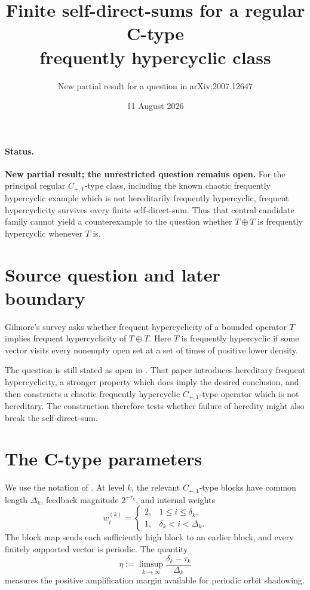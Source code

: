\documentclass[11pt]{article}
\title{Finite self-direct-sums for a regular C-type\\
frequently hypercyclic class}
\author{New partial result for a question in arXiv:2007.12647}
\date{11 August 2026}
\begin{document}
\maketitle

\paragraph{Status.}
\textbf{New partial result; the unrestricted question remains open.}
For the principal regular \(C_{+,1}\)-type class, including the known chaotic
frequently hypercyclic example which is not hereditarily frequently
hypercyclic, frequent hypercyclicity survives every finite self-direct-sum.
Thus that central candidate family cannot yield a counterexample to the
question whether \(T\oplus T\) is frequently hypercyclic whenever \(T\) is.

\section*{Source question and later boundary}
Gilmore's survey \cite{survey} asks whether frequent hypercyclicity of a
bounded operator \(T\) implies frequent hypercyclicity of \(T\oplus T\).
Here \(T\) is frequently hypercyclic if some vector visits every nonempty open
set at a set of times of positive lower density.

The question is still stated as open in \cite{hfhc}.  That paper introduces
hereditary frequent hypercyclicity, a stronger property which does imply the
desired conclusion, and then constructs a chaotic frequently hypercyclic
\(C_{+,1}\)-type operator which is not hereditary.  The construction therefore
tests whether failure of heredity might also break the self-direct-sum.

\section*{The C-type parameters}
We use the notation of \cite{gmm}.  At level \(k\), the relevant
\(C_{+,1}\)-type blocks have common length \(\Delta_k\), feedback magnitude
\(2^{-\tau_k}\), and internal weights
\[
 w_i^{(k)}=
 \begin{cases}
 2,&1\le i\le\delta_k,\\
 1,&\delta_k<i<\Delta_k.
 \end{cases}
\]
The block map sends each sufficiently high block to an earlier block, and
every finitely supported vector is periodic.  The quantity
\[
 \eta:=\limsup_{k\to\infty}
 \frac{\delta_k-\tau_k}{\Delta_k}
\]
measures the positive amplification margin available for periodic orbit
shadowing.
\end{document}
